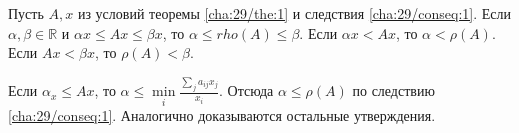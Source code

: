 \begin{conseq}[]\label{cha:29/conseq:2}
	Пусть $A,x$ из условий теоремы \ref{cha:29/the:1} и следствия \ref{cha:29/conseq:1}. Если $\alpha,\beta \in \mathbb{R}$ и $\alpha x \le Ax \le \beta x$, то $\alpha \le rho(A) \le \beta$. Если $\alpha x < Ax$, то $\alpha < \rho(A)$. Если $Ax < \beta x$, то $\rho(A) < \beta$.
\end{conseq}
\begin{Proof}
	Если $\alpha_x \le Ax$, то $\displaystyle \alpha \le \underset{i}{\min} \frac{\underset{j}{\overset{}{\sum}}a_{ij}x_j}{x_i}$. Отсюда $\alpha \le \rho(A)$ по следствию \ref{cha:29/conseq:1}. Аналогично доказываются остальные утверждения.
\end{Proof}













